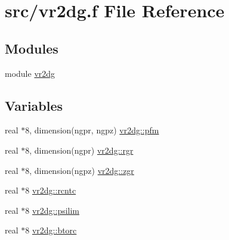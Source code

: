 \hypertarget{vr2dg_8f}{
\section{src/vr2dg.f File Reference}
\label{vr2dg_8f}
}
\subsection*{Modules}
\begin{CompactItemize}
\item 
module \hyperlink{namespacevr2dg}{vr2dg}
\end{CompactItemize}
\subsection*{Variables}
\begin{CompactItemize}
\item 
real $\ast$8, dimension(ngpr, ngpz) \hyperlink{namespacevr2dg_42625803c3e8d435cb3bcfbcdee23e3c}{vr2dg::pfm}
\item 
real $\ast$8, dimension(ngpr) \hyperlink{namespacevr2dg_3eeb651bf34a7d309b1864cc47e11dcb}{vr2dg::rgr}
\item 
real $\ast$8, dimension(ngpz) \hyperlink{namespacevr2dg_5d150eacbf91120938d72cbc757d5553}{vr2dg::zgr}
\item 
real $\ast$8 \hyperlink{namespacevr2dg_93160973c5eabc15efb36b70f53bcb02}{vr2dg::rcntc}
\item 
real $\ast$8 \hyperlink{namespacevr2dg_392d636527ed6281bd226ab7b1c54ac1}{vr2dg::psilim}
\item 
real $\ast$8 \hyperlink{namespacevr2dg_e099a50d66459d94c494edf28bc68b78}{vr2dg::btorc}
\end{CompactItemize}
